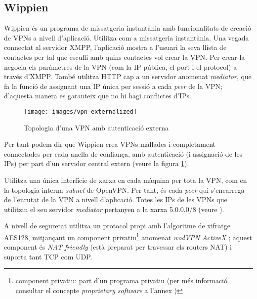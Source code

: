 \subsection{Wippien}
Wippien és un programa de missatgeria instantània amb funcionalitats de creació de VPNs a nivell d'aplicació. Utilitza  com a missatgeria instantània. Una vegada connectat al servidor XMPP, l'aplicació mostra a l'usuari la seva llista de contactes per tal que esculli amb quins contactes vol crear la VPN. Per crear-la negocia els paràmetres de la VPN (com la IP pública, el port i el protocol) a través d'XMPP. També utilitza HTTP cap a un servidor anomenat \emph{mediator}, que fa la funció de  assignant una IP única per sessió a cada \emph{peer} de la VPN; d'aquesta manera es garanteix que no hi hagi conflictes d'IPs.
\begin{figure}[htb]
\centering
\texttt{[image: images/vpn-externalized]}
\caption{Topologia d'una VPN amb autenticació externa}
\label{F:vpn-externalized}
\end{figure}
Per tant podem dir que Wippien crea VPNs mallades i completament connectades per cada anella de confiança, amb autenticació (i assignació de les IPs) per part d'un servidor central extern (veure la figura \ref{F:vpn-externalized}).

Utilitza una única interfície de xarxa en cada màquina per tota la VPN, com en la topologia interna \emph{subnet} de OpenVPN. Per tant, és cada \emph{peer} qui s'encarrega de l'enrutat de la VPN a nivell d'aplicació. Totes les IPs de les VPNs que utilitzin el seu servidor \emph{mediator} pertanyen a la xarxa 5.0.0.0/8 (veure \cite{wippien-web}).

A nivell de seguretat utilitza un protocol propi amb l'algoritme de xifratge AES128, mitjançant un component privatiu\footnote{component privatiu: part d'un programa privatiu (per més informació consultar el concepte \emph{proprietary software} a l'annex )} anomenat \emph{wodVPN ActiveX} \cite{wippien-comp}; aquest component és \emph{NAT friendly} (està preparat per travessar els routers NAT) i suporta tant TCP com UDP.

